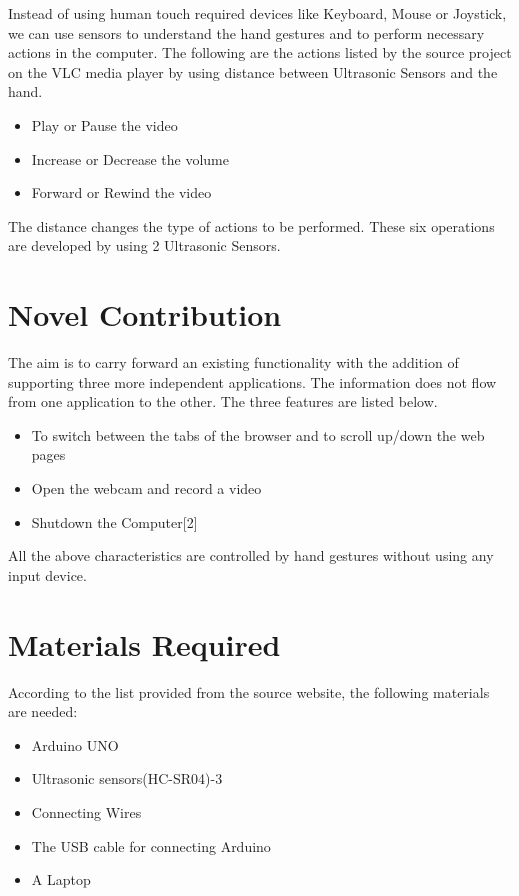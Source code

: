 \documentclass[journal]{IEEEtran}
\begin{document}
\par Instead of using human touch required devices like Keyboard, Mouse or Joystick, we can use sensors to understand the hand gestures and to perform necessary actions in the computer. The following are the actions listed by the source project on the VLC media player by using distance between Ultrasonic Sensors and the hand. 
\begin{itemize}
  \item Play or Pause the video
  \item Increase or Decrease the volume
  \item Forward or Rewind the video
\end{itemize}

The distance changes the type of actions to be performed. These six operations are developed by using 2 Ultrasonic Sensors.



\section{Novel Contribution}

The aim is to carry forward an existing functionality with the addition of supporting three more independent applications. The information does not flow from one application to the other. The three features are listed below.
\begin{itemize}
  \item To switch between the tabs of the browser and to scroll up/down the web pages
  \item Open the webcam and record a video
  \item Shutdown the Computer[2]
\end{itemize}
All the above characteristics are controlled by hand gestures without using any input device.
\section{Materials Required}

According to the list provided from the source website, the following materials are needed:
\begin{itemize}
  \item Arduino UNO
  \item Ultrasonic sensors(HC-SR04)-3
  \item Connecting Wires
  \item The USB cable for connecting Arduino
  \item A Laptop
\end{itemize}
\end{document}
